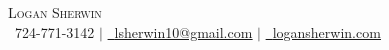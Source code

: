 \documentclass[letterpaper,11pt]{article}
\newcommand\+{\raisebox{0.35ex}{\tiny +}}
\begin{document}
\begin{center}
  {\Huge \scshape Logan Sherwin} \\ \vspace{2pt}
  \small \raisebox{-0.1\height}\ 724-771-3142 $|$
  \href{mailto:lsherwin10@gmail.com}{\raisebox{-0.2\height}\  \underline{lsherwin10@gmail.com}} $|$
  \href{https://logansherwin.com/}{\raisebox{-0.2\height}\ \underline{logansherwin.com}}
  \vspace{-2pt}
\end{center}
\end{document}
